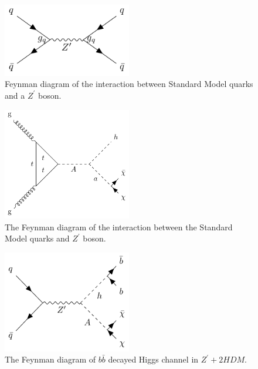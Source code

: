 \begin{figure}[htbp]
  \begin{center}
    \includegraphics[width=0.5\textwidth]{chapters/c2/figures/z-prime}
  \end{center}
  \caption{Feynman diagram of the interaction between Standard Model quarks and a $Z^{\prime}$ boson.}
  \label{fig:c2zprime}
\end{figure}

\begin{figure}[htbp]
  \begin{center}
    \includegraphics[width=0.5\textwidth]{chapters/c2/figures/two-higgs}
  \end{center}
  \caption{The Feynman diagram of the interaction between the Standard Model quarks and $Z^{\prime}$ boson.}
  \label{fig:twohiggs}
\end{figure}

\begin{figure}[htbp]
  \begin{center}
    \includegraphics[width=0.5\textwidth]{chapters/c2/figures/z-prime-2hdm}
  \end{center}
  \caption{The Feynman diagram of $b\bar{b}$ decayed Higgs channel in $Z^{\prime}+2HDM$.}
  \label{fig:c2zprime2hdm}
\end{figure}


